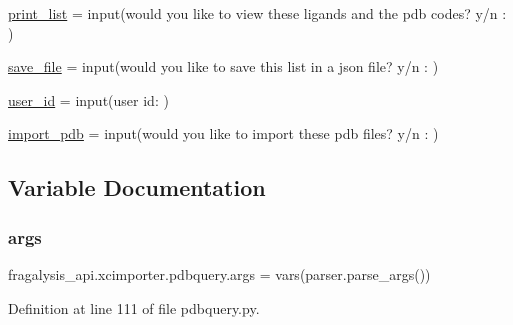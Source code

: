 \begin{DoxyCompactItemize}
\item 
\hyperlink{namespacefragalysis__api_1_1xcimporter_1_1pdbquery_a86c375701bbb49fc0670930962e1d2ee}{print\+\_\+list} = input(\textquotesingle{}would you like to view these ligands and the pdb codes? y/n \+: \textquotesingle{})
\item 
\hyperlink{namespacefragalysis__api_1_1xcimporter_1_1pdbquery_a19f95edc9111d90eafa40886ee98423c}{save\+\_\+file} = input(\textquotesingle{}would you like to save this list in a json file? y/n \+: \textquotesingle{})
\item 
\hyperlink{namespacefragalysis__api_1_1xcimporter_1_1pdbquery_a91f879693753cc8b9a1fb254c075368e}{user\+\_\+id} = input(\textquotesingle{}user id\+: \textquotesingle{})
\item 
\hyperlink{namespacefragalysis__api_1_1xcimporter_1_1pdbquery_a79bb87d0ca3ad7b21d937ab25dc37b21}{import\+\_\+pdb} = input(\textquotesingle{}would you like to import these pdb files? y/n \+: \textquotesingle{})
\end{DoxyCompactItemize}


\subsection{Variable Documentation}
\mbox{\label{namespacefragalysis__api_1_1xcimporter_1_1pdbquery_aa63ace70140ec79679f3f8be87bb2564}} 
\subsubsection{\texorpdfstring{args}{args}}
{\footnotesize\ttfamily fragalysis\+\_\+api.\+xcimporter.\+pdbquery.\+args = vars(parser.\+parse\+\_\+args())}



Definition at line 111 of file pdbquery.\+py.

\mbox{\label{namespacefragalysis__api_1_1xcimporter_1_1pdbquery_a76497bee6f8c2a47827613858ded72d5}} 
